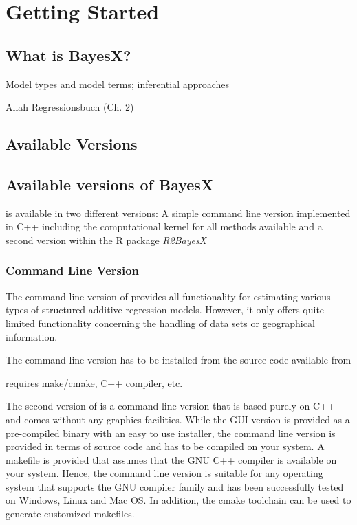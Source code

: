 
\chapter{Getting Started}

\section{What is BayesX?}

Model types and model terms; inferential approaches

Allah Regressionsbuch (Ch. 2)


\section{Available Versions}

\section{Available versions of BayesX}
 \label{availableversions} 

\BayesX is available in two different versions: A simple command line version implemented in C++ including the computational kernel for all methods available and a second version within the R package {\it R2BayesX}

\subsection{Command Line Version}

The command line version of \BayesX provides all functionality for estimating various types of structured additive regression models. However, it only offers quite limited functionality concerning the handling of data sets or geographical information. 

The command line version has to be installed from the source code available from

requires make/cmake, C++ compiler, etc.



The second version of \BayesX is a command line version that is based purely on C++ and comes without any graphics
facilities. While the GUI version is provided as a pre-compiled binary with an easy to use installer, the command line
version is provided in terms of source code and has to be compiled on your system. A makefile is provided that assumes that
the GNU C++ compiler is available on your system. Hence, the command line version is suitable for any operating system that
supports the GNU compiler family and has been successfully tested on Windows, Linux and Mac OS. In addition, the cmake toolchain can be used to generate customized makefiles.

